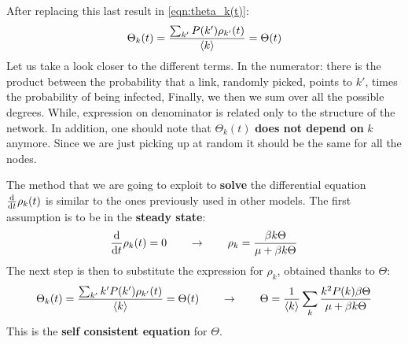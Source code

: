 \documentclass[../main/main.tex]{subfiles}
\begin{document}
After replacing this last result in \ref{eqn:theta_k(t)}:
\begin{equation*}
  \Theta _k (t) = \frac{\sum_{k'}^{} P(k') \rho _{k'} (t)  }{\expval{k} } = \Theta (t)
\end{equation*}
Let us take a look closer to the different terms. In the numerator: there is the product between the probability that a link, randomly picked, points to \( k' \), times the probability of being infected, Finally, we then we sum over all the possible degrees. While, expression on denominator is related only to the structure of the network. In addition, one should note that \( \Theta _k (t) \) \textbf{does not depend on} \( k \) anymore. Since we are just picking up at random it should be the same for all the nodes.

The method that we are going to exploit to \textbf{solve} the differential equation \( \dv{}{t} \rho _k (t) \) is similar to the ones previously used in other models. The first assumption is to be in the \textbf{steady state}:
\begin{equation*}
  \dv{}{t} \rho _k (t) = 0 \qquad \rightarrow  \qquad \rho _k = \frac{\beta k \Theta }{\mu + \beta k \Theta }
\end{equation*}
The next step is then to substitute the expression for \( \rho _k  \), obtained thanks to \( \Theta  \):
\begin{equation*}
    \Theta _k (t) = \frac{\sum_{k'}^{} k' P(k') \rho _{k'} (t)  }{\expval{k} } = \Theta (t) \qquad \rightarrow \qquad \Theta = \frac{1}{\expval{k} } \sum_{k}^{} \frac{k^2 P(k) \beta \Theta }{\mu + \beta k \Theta }
\end{equation*}
This is the \textbf{self consistent equation} for \( \Theta  \).
\end{document}
